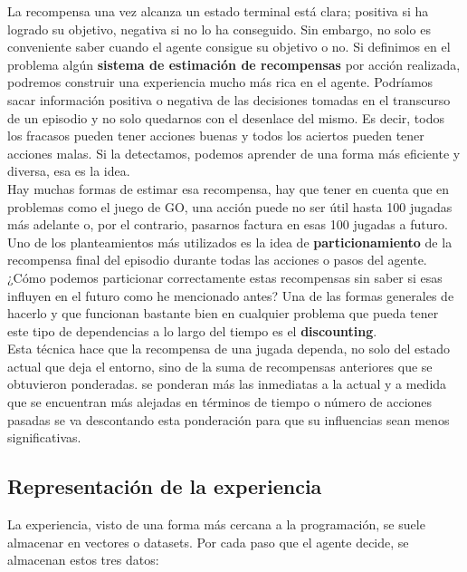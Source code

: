 \documentclass[11pt,fleqn]{book} %
\begin{document}
La recompensa una vez alcanza un estado terminal está clara; positiva si ha logrado su objetivo, negativa si no lo ha conseguido. Sin embargo, no solo es conveniente saber cuando el agente consigue su objetivo o no. Si definimos en el problema algún \textbf{sistema de estimación de recompensas} por acción realizada, podremos construir una experiencia mucho más rica en el agente. Podríamos sacar información positiva o negativa de las decisiones tomadas en el transcurso de un episodio y no solo quedarnos con el desenlace del mismo. Es decir, todos los fracasos pueden tener acciones buenas y todos los aciertos pueden tener acciones malas. Si la detectamos, podemos aprender de una forma más eficiente y diversa, esa es la idea. \\

Hay muchas formas de estimar esa recompensa, hay que tener en cuenta que en problemas como el juego de GO, una acción puede no ser útil hasta 100 jugadas más adelante o, por el contrario, pasarnos factura en esas 100 jugadas a futuro. \\

Uno de los planteamientos más utilizados es la idea de \textbf{particionamiento} de la recompensa final del episodio durante todas las acciones o pasos del agente. ¿Cómo podemos particionar correctamente estas recompensas sin saber si esas influyen en el futuro como he mencionado antes? Una de las formas generales de hacerlo y que funcionan bastante bien en cualquier problema que pueda tener este tipo de dependencias a lo largo del tiempo es el \textbf{discounting}. \\

Esta técnica hace que la recompensa de una jugada dependa, no solo del estado actual que deja el entorno, sino de la suma de recompensas anteriores que se obtuvieron ponderadas. se ponderan más las inmediatas a la actual y a medida que se encuentran más alejadas en términos de tiempo o número de acciones pasadas se va descontando esta ponderación para que su influencias sean menos significativas. \\

\subsection{Representación de la experiencia}\label{sec:representacionexperiencia}

La experiencia, visto de una forma más cercana a la programación, se suele almacenar en vectores o datasets. Por cada paso que el agente decide, se almacenan estos tres datos: \\
\end{document}
